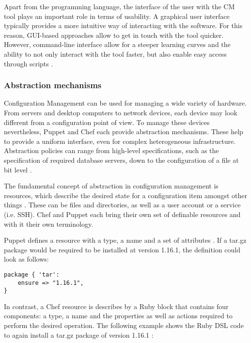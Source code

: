 Apart from the programming language, the interface of the user with the CM tool plays an important role in terms of usability. A graphical user interface typically provides a more intuitive way of interacting with the software. For this reason, GUI-based approaches allow to get in touch with the tool quicker. However, command-line interface allow for a steeper learning curves and the ability to not only interact with the tool faster, but also enable easy access through scripts \cite{delaet2010survey}.

\subsubsection{Abstraction mechanisms}

Configuration Management can be used for managing a wide variety of hardware. From servers and desktop computers to network devices, each device may look different from a configuration point of view. To manage these devices nevertheless, Puppet and Chef each provide abstraction mechanisms. These help to provide a uniform interface, even for complex heterogeneous infrastructure. Abstraction policies can range from high-level specifications, such as the specification of required database servers, down to the configuration of a file at bit level \cite{delaet2010survey}.

The fundamental concept of abstraction in configuration management is resources, which describe the desired state for a configuration item amongst other things \cite{chefioresource}. These can be files and directories, as well as a user account or a service (i.e. SSH). Chef and Puppet each bring their own set of definable resources and with it their own terminology.

Puppet defines a resource with a type, a name and a set of attributes \cite{pandey2012investigating}. If a tar.gz package would be required to be installed at version 1.16.1, the definition could look as follows:

\begin{verbatim}
package { 'tar':
	ensure => "1.16.1",
}
\end{verbatim}

In contrast, a Chef resource is describes by a Ruby block that contains four components: a type, a name and the properties as well as actions required to perform the desired operation. The following example  shows the Ruby DSL code to again install a tar.gz package of version 1.16.1 \cite{chefioresource}:

